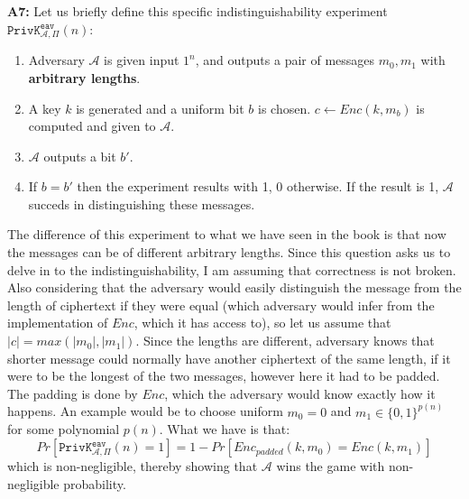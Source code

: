 \documentclass[12pt,reqno]{amsart}
\newcommand{\code}[1]{\texttt{#1}}
\newcommand{\advrs}[0]{\mathcal{A}}
\begin{document}
\textbf{A7:} Let us briefly define this specific indistinguishability experiment $\code{PrivK}_{\advrs, \Pi}^{\code{eav}}(n)$:
\begin{enumerate}
\item Adversary $\advrs$ is given input $1^n$, and outputs a pair of messages $m_0, m_1$ with \textbf{arbitrary lengths}.
\item A key $k$ is generated and a uniform bit $b$ is chosen. $c \xleftarrow{} Enc(k,m_b)$ is computed and given to $\advrs$. 
\item $\advrs$ outputs a bit $b'$.
\item If $b=b'$ then the experiment results with 1, 0 otherwise. If the result is 1, $\advrs$ succeds in distinguishing these messages.
\end{enumerate}
The difference of this experiment to what we have seen in the book is that now the messages can be of different arbitrary lengths. Since this question asks us to delve in to the indistinguishability, I am assuming that correctness is not broken. Also considering that the adversary would easily distinguish the message from the length of ciphertext if they were equal (which adversary would infer from the implementation of $Enc$, which it has access to), so let us assume that $|c|=max(|m_0|,|m_1|)$. Since the lengths are different, adversary knows that shorter message could normally have another ciphertext of the same length, if it were to be the longest of the two messages, however here it had to be padded. The padding is done by $Enc$, which the adversary would know exactly how it happens. An example would be to choose uniform $m_0 = 0$ and $m_1 \in \{0, 1\}^{p(n)}$ for some polynomial $p(n)$. What we have is that:
$$
Pr[\code{PrivK}_{\advrs, \Pi}^{\code{eav}}(n)=1] = 1 - Pr[Enc_{padded}(k,m_0)=Enc(k,m_1)]
$$
which is non-negligible, thereby showing that $\advrs$ wins the game with non-negligible probability.
\end{document}
